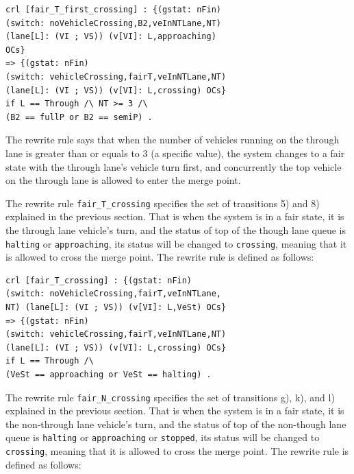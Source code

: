 \documentclass[10pt, conference, compsocconf]{IEEEtran}
\begin{document}
\begin{small}
\begin{verbatim}
crl [fair_T_first_crossing] : {(gstat: nFin) 
(switch: noVehicleCrossing,B2,veInNTLane,NT) 
(lane[L]: (VI ; VS)) (v[VI]: L,approaching) 
OCs} 
=> {(gstat: nFin) 
(switch: vehicleCrossing,fairT,veInNTLane,NT) 
(lane[L]: (VI ; VS)) (v[VI]: L,crossing) OCs} 
if L == Through /\ NT >= 3 /\ 
(B2 == fullP or B2 == semiP) .
\end{verbatim}
\end{small}

\noindent
The rewrite rule says that when the number of vehicles running on the through lane is greater than or equals to 3 (a specific value), the system changes to a fair state with the through lane's vehicle turn first, and concurrently the top vehicle on the through lane is allowed to enter the merge point.

The rewrite rule \verb!fair_T_crossing! specifies the set of transitions 5) and 8) explained in the previous section.
That is when the system is in a fair state, it is the through lane vehicle's turn, and the status of top of the though lane queue is \verb!halting! or \verb!approaching!, its status will be changed to \verb!crossing!, meaning that it is allowed to cross the merge point.
The rewrite rule is defined as follows:

\begin{small}
\begin{verbatim}
crl [fair_T_crossing] : {(gstat: nFin) 
(switch: noVehicleCrossing,fairT,veInNTLane,
NT) (lane[L]: (VI ; VS)) (v[VI]: L,VeSt) OCs} 
=> {(gstat: nFin) 
(switch: vehicleCrossing,fairT,veInNTLane,NT) 
(lane[L]: (VI ; VS)) (v[VI]: L,crossing) OCs} 
if L == Through /\ 
(VeSt == approaching or VeSt == halting) .
\end{verbatim}
\end{small}

The rewrite rule \verb!fair_N_crossing! specifies the set of transitions g), k), and l) explained in the previous section.
That is when the system is in a fair state, it is the non-through lane vehicle's turn, and the status of top of the non-though lane queue is \verb!halting! or \verb!approaching! or \verb!stopped!, its status will be changed to \verb!crossing!, meaning that it is allowed to cross the merge point.
The rewrite rule is defined as follows:
\end{document}
